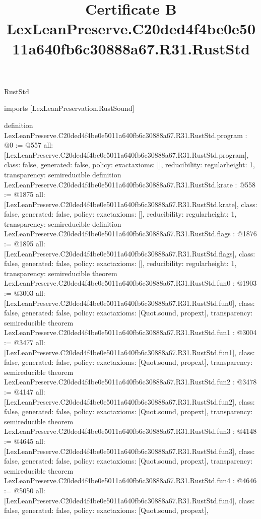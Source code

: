 \begin{lexlean}{RustStd}
\title{Certificate B LexLeanPreserve.C20ded4f4be0e5011a640fb6c30888a67.R31.RustStd}
\begin{coremodule}
imports [LexLeanPreservation.RustSound]

definition LexLeanPreserve.C20ded4f4be0e5011a640fb6c30888a67.R31.RustStd.program : @0 := @557 {
  all: [LexLeanPreserve.C20ded4f4be0e5011a640fb6c30888a67.R31.RustStd.program],
  class: false,
  generated: false,
  policy: exact{axioms: []},
  reducibility: regular{height: 1},
  transparency: semireducible
}
definition LexLeanPreserve.C20ded4f4be0e5011a640fb6c30888a67.R31.RustStd.krate : @558 := @1875 {
  all: [LexLeanPreserve.C20ded4f4be0e5011a640fb6c30888a67.R31.RustStd.krate],
  class: false,
  generated: false,
  policy: exact{axioms: []},
  reducibility: regular{height: 1},
  transparency: semireducible
}
definition LexLeanPreserve.C20ded4f4be0e5011a640fb6c30888a67.R31.RustStd.flags : @1876 := @1895 {
  all: [LexLeanPreserve.C20ded4f4be0e5011a640fb6c30888a67.R31.RustStd.flags],
  class: false,
  generated: false,
  policy: exact{axioms: []},
  reducibility: regular{height: 1},
  transparency: semireducible
}
theorem LexLeanPreserve.C20ded4f4be0e5011a640fb6c30888a67.R31.RustStd.fun0 : @1903 := @3003 {
  all: [LexLeanPreserve.C20ded4f4be0e5011a640fb6c30888a67.R31.RustStd.fun0],
  class: false,
  generated: false,
  policy: exact{axioms: [Quot.sound, propext]},
  transparency: semireducible
}
theorem LexLeanPreserve.C20ded4f4be0e5011a640fb6c30888a67.R31.RustStd.fun1 : @3004 := @3477 {
  all: [LexLeanPreserve.C20ded4f4be0e5011a640fb6c30888a67.R31.RustStd.fun1],
  class: false,
  generated: false,
  policy: exact{axioms: [Quot.sound, propext]},
  transparency: semireducible
}
theorem LexLeanPreserve.C20ded4f4be0e5011a640fb6c30888a67.R31.RustStd.fun2 : @3478 := @4147 {
  all: [LexLeanPreserve.C20ded4f4be0e5011a640fb6c30888a67.R31.RustStd.fun2],
  class: false,
  generated: false,
  policy: exact{axioms: [Quot.sound, propext]},
  transparency: semireducible
}
theorem LexLeanPreserve.C20ded4f4be0e5011a640fb6c30888a67.R31.RustStd.fun3 : @4148 := @4645 {
  all: [LexLeanPreserve.C20ded4f4be0e5011a640fb6c30888a67.R31.RustStd.fun3],
  class: false,
  generated: false,
  policy: exact{axioms: [Quot.sound, propext]},
  transparency: semireducible
}
theorem LexLeanPreserve.C20ded4f4be0e5011a640fb6c30888a67.R31.RustStd.fun4 : @4646 := @5050 {
  all: [LexLeanPreserve.C20ded4f4be0e5011a640fb6c30888a67.R31.RustStd.fun4],
  class: false,
  generated: false,
  policy: exact{axioms: [Quot.sound, propext]},
}
\end{coremodule}
\end{lexlean}
